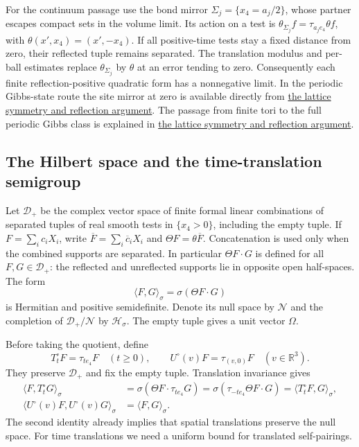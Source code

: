 \documentclass[11pt,letterpaper,reqno]{amsart}
\theoremstyle{definition}
\theoremstyle{remark}
\newcommand{\R}{\mathbb R}
\begin{document}
For the continuum passage use the bond mirror
$\Sigma_j=\{x_4=a_j/2\}$, whose partner escapes compact sets in
the volume limit. Its action on a test is
$\theta_{\Sigma_j}f=\tau_{a_je_4}\theta f$, with
$\theta(x',x_4)=(x',-x_4)$. If all positive-time tests stay a fixed
distance from zero, their reflected tuple remains separated. The
translation modulus and per-ball estimates replace
$\theta_{\Sigma_j}$ by $\theta$ at an error tending to zero.
Consequently each finite reflection-positive quadratic form has a
nonnegative limit. In the periodic Gibbs-state route the site mirror
at zero is available directly from \hyperref[hyp:gibbs-reflections]{the lattice symmetry and reflection argument}.
The passage from finite tori to the full periodic Gibbs class is
explained in \hyperref[hyp:gibbs-reflections]{the lattice symmetry and
reflection argument}.

\subsection{The Hilbert space and the time-translation semigroup}

Let $\mathcal D_+$ be the complex vector space of finite formal linear
combinations of separated tuples of real smooth tests in $\{x_4>0\}$, including the
empty tuple. If $F=\sum_ic_iX_i$, write
$\overline F=\sum_i\overline c_iX_i$ and
$\Theta F=\theta\overline F$. Concatenation is used only when the
combined supports are separated. In particular $\Theta F\cdot G$
is defined for all $F,G\in\mathcal D_+$: the reflected and unreflected
supports lie in opposite open half-spaces. The form
\[
 \langle F,G\rangle_\sigma=\sigma(\Theta F\cdot G)
\]
is Hermitian and positive semidefinite. Denote its null space by
$\mathcal N$ and the completion of $\mathcal D_+/\mathcal N$ by
$\mathcal H_\sigma$. The empty tuple gives a unit vector $\Omega$.

Before taking the quotient, define
\[
 T_t^\circ F=\tau_{te_4}F\quad(t\ge0),
 \qquad U^\circ(v)F=\tau_{(v,0)}F\quad(v\in\R^3).
\]
They preserve $\mathcal D_+$ and fix the empty tuple. Translation
invariance gives
\begin{align*}
 \langle F,T_t^\circ G\rangle_\sigma
 &=\sigma(\Theta F\cdot\tau_{te_4}G)
   =\sigma(\tau_{-te_4}\Theta F\cdot G)
   =\langle T_t^\circ F,G\rangle_\sigma,\\
 \langle U^\circ(v)F,U^\circ(v)G\rangle_\sigma
 &=\langle F,G\rangle_\sigma.
\end{align*}
The second identity already implies that spatial translations preserve
the null space. For time translations we need a uniform bound for
translated self-pairings.
\end{document}

